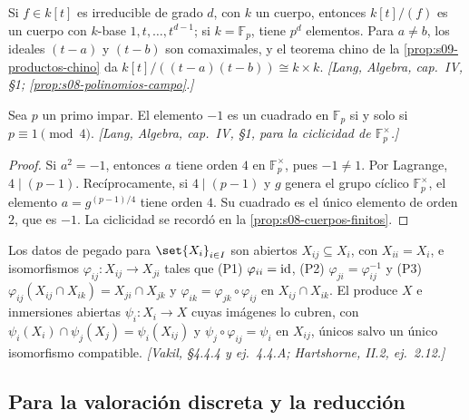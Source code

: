 \begin{prop}
\label{prop:s09-polinomios-cuerpo}
Si $f\in k[t]$ es irreducible de grado $d$, con $k$ un cuerpo, entonces $k[t]/(f)$ es un cuerpo con $k$-base $1,t,\ldots,t^{d-1}$; si $k=\mathbb F_p$, tiene $p^d$ elementos. Para $a\ne b$, los ideales $(t-a)$ y $(t-b)$ son comaximales, y el teorema chino de la \cref{prop:s09-productos-chino} da $k[t]/((t-a)(t-b))\cong k\times k$. \emph{[Lang, \emph{Algebra}, cap.~IV, \S1; \cref{prop:s08-polinomios-campo}.]}
\end{prop}

\begin{prop}[La ecuación $x^2=-1$ módulo $p$]
\label{prop:s09-menos-uno-cuadrado}
Sea $p$ un primo impar. El elemento $-1$ es un cuadrado en $\mathbb F_p$ si y solo si $p\equiv1\pmod4$. \emph{[Lang, \emph{Algebra}, cap.~IV, \S1, para la ciclicidad de $\mathbb F_p^\times$.]}
\end{prop}
\begin{proof}
Si $a^2=-1$, entonces $a$ tiene orden $4$ en $\mathbb F_p^\times$, pues $-1\ne1$. Por Lagrange, $4\mid(p-1)$. Recíprocamente, si $4\mid(p-1)$ y $g$ genera el grupo cíclico $\mathbb F_p^\times$, el elemento $a=g^{(p-1)/4}$ tiene orden $4$. Su cuadrado es el único elemento de orden $2$, que es $-1$. La ciclicidad se recordó en la \cref{prop:s08-cuerpos-finitos}.
\end{proof}

\begin{defi}
\label{defi:s09-datos-pegado}
Los datos de pegado para $\set{X_i}_{i\in I}$ son abiertos $X_{ij}\subseteq X_i$, con $X_{ii}=X_i$, e isomorfismos $\varphi_{ij}\colon X_{ij}\to X_{ji}$ tales que (P1) $\varphi_{ii}=\operatorname{id}$, (P2) $\varphi_{ji}=\varphi_{ij}^{-1}$ y (P3) $\varphi_{ij}(X_{ij}\cap X_{ik})=X_{ji}\cap X_{jk}$ y $\varphi_{ik}=\varphi_{jk}\circ\varphi_{ij}$ en $X_{ij}\cap X_{ik}$. El  produce $X$ e inmersiones abiertas $\psi_i\colon X_i\to X$ cuyas imágenes lo cubren, con $\psi_i(X_i)\cap\psi_j(X_j)=\psi_i(X_{ij})$ y $\psi_j\circ\varphi_{ij}=\psi_i$ en $X_{ij}$, únicos salvo un único isomorfismo compatible. \emph{[Vakil, \S4.4.4 y ej.~4.4.A; Hartshorne, II.2, ej.~2.12.]}
\end{defi}

\subsection{Para la valoración discreta y la reducción}


